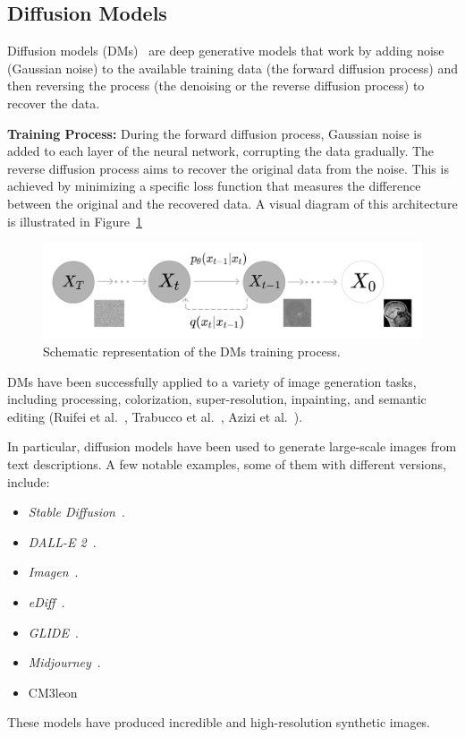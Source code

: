         
\subsection{Diffusion Models}

Diffusion models (DMs)~\cite{DDPM} are deep generative models that work by adding noise (Gaussian noise) to the available training data (the forward diffusion process) and then reversing the process (the denoising or the reverse diffusion process) to recover the data. 

\textbf{Training Process:} During the forward diffusion process, Gaussian noise is added to each layer of the neural network, corrupting the data gradually. The reverse diffusion process aims to recover the original data from the noise. This is achieved by minimizing a specific loss function that measures the difference between the original and the recovered data. A visual diagram of this architecture is illustrated in Figure~\ref{fig:dm_training_process}

\begin{figure}[H]
\centering
\includegraphics[width=\columnwidth]{main/content/images/diagrams/dm.png}
\caption{Schematic representation of the DMs training process.}
\label{fig:dm_training_process}
\end{figure}

DMs have been successfully applied to a variety of image generation tasks, including processing, colorization, super-resolution, inpainting, and semantic editing (Ruifei et al.~\cite{he2023synthetic}, Trabucco et al.~\cite{trabucco2023effective}, Azizi et al.~\cite{azizi2023synthetic}).

In particular, diffusion models have been used to generate large-scale images from text descriptions. A few notable examples, some of them with different versions, include:
    \begin{itemize}
        \item \textit{Stable Diffusion}~\cite{stable_diffusion}.
        \item \textit{DALL-E 2}~\cite{dalle2}.
        \item \textit{Imagen}~\cite{imagen}.
        \item \textit{eDiff}~\cite{balaji2023ediffi}.
        \item \textit{GLIDE}~\cite{glide}.
        \item \textit{Midjourney}~\cite{midjourney}.
        \item CM3leon~\cite{cm3leon}
    \end{itemize}
These models have produced incredible and high-resolution synthetic images.

